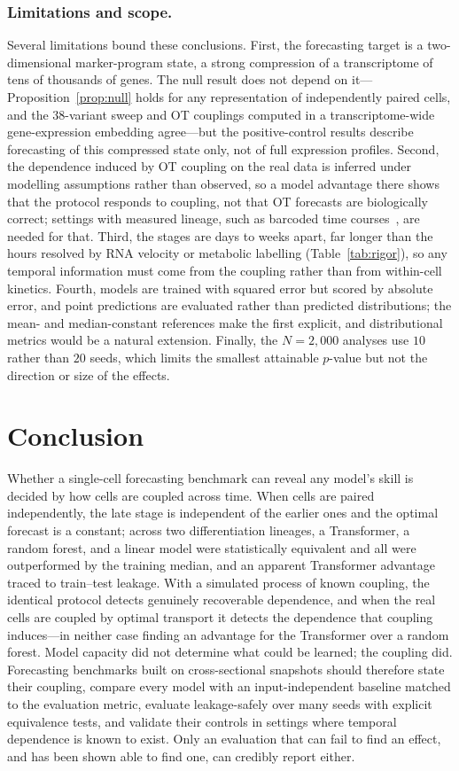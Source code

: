 \documentclass[pdflatex,sn-mathphys-num]{sn-jnl}
\theoremstyle{thmstyleone}%
\theoremstyle{thmstyletwo}%
\theoremstyle{thmstylethree}%
\begin{document}
\subsubsection{Limitations and scope.} Several limitations bound these conclusions. First, the forecasting target is a two-dimensional marker-program state, a strong compression of a transcriptome of tens of thousands of genes. The null result does not depend on it---Proposition~\ref{prop:null} holds for any representation of independently paired cells, and the $38$-variant sweep and OT couplings computed in a transcriptome-wide gene-expression embedding agree---but the positive-control results describe forecasting of this compressed state only, not of full expression profiles. Second, the dependence induced by OT coupling on the real data is inferred under modelling assumptions rather than observed, so a model advantage there shows that the protocol responds to coupling, not that OT forecasts are biologically correct; settings with measured lineage, such as barcoded time courses~\cite{weinreb2020lineage}, are needed for that. Third, the stages are days to weeks apart, far longer than the hours resolved by RNA velocity or metabolic labelling (Table~\ref{tab:rigor}), so any temporal information must come from the coupling rather than from within-cell kinetics. Fourth, models are trained with squared error but scored by absolute error, and point predictions are evaluated rather than predicted distributions; the mean- and median-constant references make the first explicit, and distributional metrics would be a natural extension. Finally, the $N=2{,}000$ analyses use $10$ rather than $20$ seeds, which limits the smallest attainable $p$-value but not the direction or size of the effects.

\section{\textbf{Conclusion}}
\label{sec:conclusion}
Whether a single-cell forecasting benchmark can reveal any model's skill is decided by how cells are coupled across time. When cells are paired independently, the late stage is independent of the earlier ones and the optimal forecast is a constant; across two differentiation lineages, a Transformer, a random forest, and a linear model were statistically equivalent and all were outperformed by the training median, and an apparent Transformer advantage traced to train--test leakage. With a simulated process of known coupling, the identical protocol detects genuinely recoverable dependence, and when the real cells are coupled by optimal transport it detects the dependence that coupling induces---in neither case finding an advantage for the Transformer over a random forest. Model capacity did not determine what could be learned; the coupling did. Forecasting benchmarks built on cross-sectional snapshots should therefore state their coupling, compare every model with an input-independent baseline matched to the evaluation metric, evaluate leakage-safely over many seeds with explicit equivalence tests, and validate their controls in settings where temporal dependence is known to exist. Only an evaluation that can fail to find an effect, and has been shown able to find one, can credibly report either.
\end{document}
